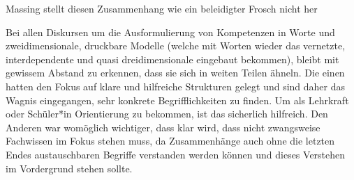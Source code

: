 


Massing stellt diesen Zusammenhang wie ein beleidigter Frosch nicht her\autocite[23]{Massing.2022}




Bei allen Diskursen um die Ausformulierung von Kompetenzen in Worte und zweidimensionale, druckbare Modelle (welche mit Worten wieder das vernetzte, interdependente und quasi dreidimensionale eingebaut bekommen), bleibt mit gewissem Abstand zu erkennen, dass sie sich in weiten Teilen ähneln.
Die einen \autocite{weißeno.2010} hatten den Fokus auf klare und hilfreiche Strukturen gelegt und sind daher das Wagnis eingegangen, sehr konkrete Begrifflichkeiten zu finden. Um als Lehrkraft oder Schüler*in Orientierung zu bekommen, ist das sicherlich hilfreich. Den Anderen \autocite{Besand.2011} war womöglich wichtiger, dass klar wird, dass nicht zwangsweise Fachwissen im Fokus stehen muss, da Zusammenhänge auch ohne die letzten Endes austauschbaren Begriffe verstanden werden können und dieses Verstehen im Vordergrund stehen sollte. 

